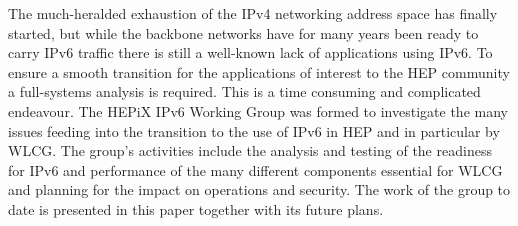 The much-heralded exhaustion of the IPv4 networking address space has finally started,
but while the backbone networks have for many years been ready to carry IPv6 traffic there is still a well-known lack of 
applications using IPv6.
To ensure a smooth transition for the applications of interest to the HEP community a full-systems analysis 
is required. This is a time consuming and complicated endeavour.
The HEPiX IPv6 Working Group \cite{ipv6wg} was formed to investigate the many issues feeding into the 
transition to the use of IPv6 in HEP and in particular by WLCG. 
The group's activities include the analysis and testing of the readiness for IPv6 and 
performance of the many different components essential for WLCG and planning for the impact on 
operations and security. The work of the group to date is presented in this paper together with its future plans.
